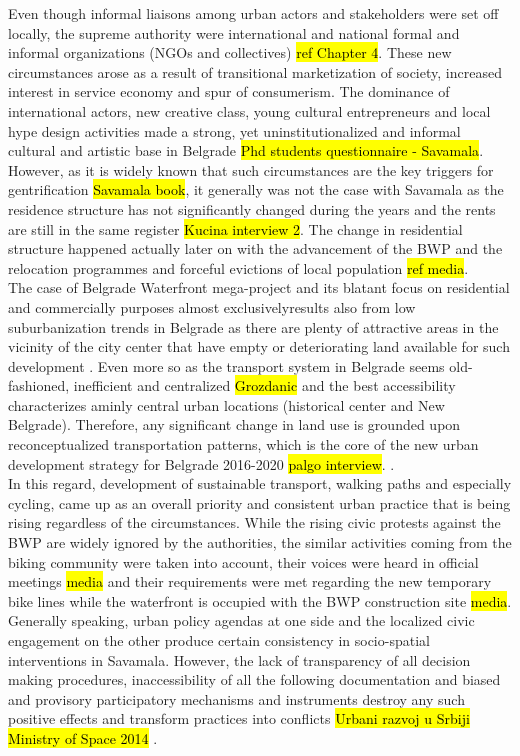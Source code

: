 \documentclass[11pt]{report}
\begin{document}
Even though informal liaisons among urban actors and stakeholders were set off locally, the supreme  authority were international and national formal and informal organizations (NGOs and collectives) \hl{ref Chapter 4}. %
These new circumstances arose as a result of transitional marketization of society, increased interest in service economy and spur of consumerism.
The dominance of international actors, new creative class, young cultural entrepreneurs and local hype design activities made a strong, yet uninstitutionalized and informal cultural and artistic base in Belgrade \hl{Phd students questionnaire - Savamala}.
However, as it is widely known that such circumstances are the key triggers for gentrification \hl{Savamala book}, it generally was not the case with Savamala as the residence structure has not significantly changed during the years and the rents are still in the same register \hl{Kucina interview 2}.
The change in residential structure happened actually later on with the advancement of the BWP and the relocation programmes and forceful evictions of local population \hl{ref media}.
\\
The case of Belgrade Waterfront mega-project and its blatant focus on residential and commercially purposes almost exclusively\footnotemark results also from low suburbanization trends in Belgrade as there are plenty of attractive areas in the vicinity of the city center that have empty or deteriorating land available for such development \cite{(Hirt 2009)}.
Even more so as the transport system in Belgrade seems old-fashioned, inefficient and centralized \hl{Grozdanic} and the best accessibility characterizes aminly central urban locations (historical center and New Belgrade).
Therefore, any significant change in land use is grounded upon reconceptualized transportation patterns, which is the core of the new urban development strategy for Belgrade 2016-2020 \hl{palgo interview}.
.
\\
In this regard, development of sustainable transport, walking paths and especially cycling, came up as an overall priority and consistent urban practice that is being rising regardless of the circumstances. While the rising civic protests against the BWP are widely ignored by the authorities, the similar activities coming from the biking community were taken into account, their voices were heard in official meetings \hl{media} and their requirements were met regarding the new temporary bike lines while the waterfront is occupied with the BWP construction site \hl{media}.
\\
Generally speaking, urban policy agendas at one side and the localized civic engagement on the other produce certain consistency in socio-spatial interventions in Savamala.
However, the lack of transparency of all decision making procedures, inaccessibility of all the following documentation and biased and provisory participatory mechanisms and instruments destroy any such positive effects and transform practices into conflicts \hl{Urbani razvoj u Srbiji Ministry of Space 2014} .
\end{document}
